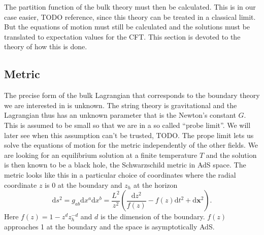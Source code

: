\documentclass[12pt]{book}
\renewcommand{\d}{\ensuremath{\mathrm{d}}}
\begin{document}
The partition function of the bulk theory must then be calculated. This is in our case easier, TODO reference, since this theory can be treated in a classical limit. But the equations of motion must still be calculated and the solutions must be translated to expectation values for the CFT. This section is devoted to the theory of how this is done.
\subsection{Metric}
The precise form of the bulk Lagrangian that corresponds to the boundary theory we are interested in is unknown. The string theory is gravitational and the Lagrangian thus has an unknown parameter that is the Newton's constant $G$. This is assumed to be small so that we are in a so called ``probe limit''. We will later see when this assumption can't be trusted, TODO. The prope limit lets us solve the equations of motion for the metric independently of the other fields. We are looking for an equilibrium solution at a finite temperature $T$ and the solution is then known to be a black hole, the Schwarzschild metric in AdS space. The metric looks like this in a particular choice of coordinates where the radial coordinate $z$ is 0 at the boundary and $z_h$ at the horizon
\begin{equation}
 \d s^2=g_{ab}\d x^a\d x^b=\frac{L^2}{z^2}\left(\frac{\d z^2}{f(z)}-f(z)\d t^2+\d \mathbf{x}^2\right).\label{metric}
\end{equation}
Here $f(z)=1-z^dz_h^{-d}$ and $d$ is the dimension of the boundary. $f(z)$ approaches 1 at the boundary and the space is asymptotically AdS.
\end{document}
